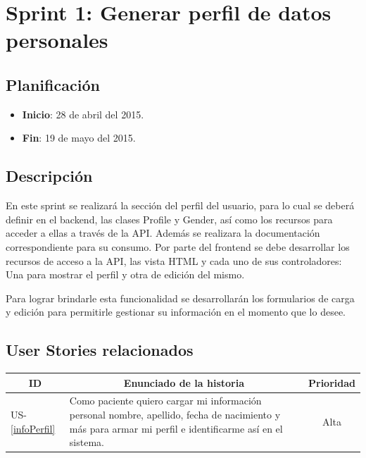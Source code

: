 \section{Sprint 1: Generar perfil de datos personales}

\subsection{Planificación}
\begin{itemize}
    \item \textbf{Inicio}: 28 de abril del 2015.
    \item \textbf{Fin}: 19 de mayo del 2015.
\end{itemize}

\subsection{Descripción}
En este sprint se realizará la sección del perfil del usuario, para lo cual se deberá definir en el backend, las clases Profile y Gender, así como los recursos para acceder a ellas a través de la API. Además se realizara la documentación correspondiente para su consumo.
Por parte del frontend se debe desarrollar los recursos de acceso a la API, las vista HTML y cada uno de sus controladores: Una para mostrar el perfil y otra de edición del mismo.

Para lograr brindarle esta funcionalidad se desarrollarán los formularios de carga y edición para permitirle gestionar su información en el momento que lo desee.

\subsection{User Stories relacionados}
{\scriptsize
\begin{table}[h]
	\begin{tabular}{|l|p{10cm}|c|}
	\hline
        \multicolumn{1}{|c|}{\textbf{ID}} &
        \multicolumn{1}{|c|}{\textbf{Enunciado de la historia}} &
        \textbf{Prioridad} \\     
    \hline
        US-\ref{infoPerfil} &
        Como paciente quiero cargar mi información personal nombre, apellido, fecha de nacimiento y más para armar mi perfil e identificarme así en el sistema.& Alta
        \\
    \hline 
	 \end{tabular}
\end{table}
}





